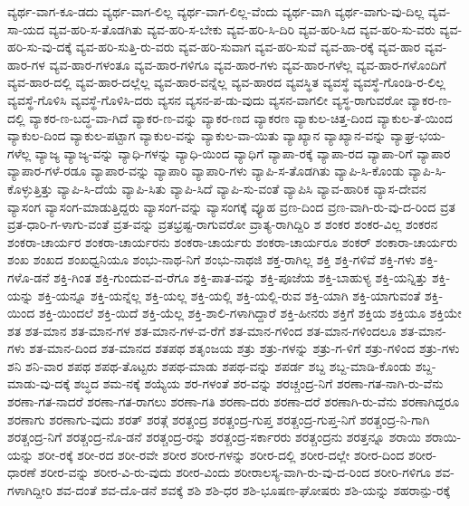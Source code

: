 {ವ್ಯರ್ಥ-ವಾಗ-ಕೂ-ಡದು
ವ್ಯರ್ಥ-ವಾಗ-ಲಿಲ್ಲ
ವ್ಯರ್ಥ-ವಾಗ-ಲಿಲ್ಲ-ವೆಂದು
ವ್ಯರ್ಥ-ವಾಗಿ
ವ್ಯರ್ಥ-ವಾಗು-ವು-ದಿಲ್ಲ
ವ್ಯವ-ಸಾ-ಯದ
ವ್ಯವ-ಹರಿ-ಸ-ತೊಡಗಿತು
ವ್ಯವ-ಹರಿ-ಸ-ಬೇಕು
ವ್ಯವ-ಹರಿ-ಸಿ-ದಿರಿ
ವ್ಯವ-ಹರಿ-ಸಿದ
ವ್ಯವ-ಹರಿ-ಸು-ವರು
ವ್ಯವ-ಹರಿ-ಸು-ವು-ದಕ್ಕೆ
ವ್ಯವ-ಹರಿ-ಸುತ್ತಿ-ರು-ವರು
ವ್ಯವ-ಹರಿ-ಸುವಾಗ
ವ್ಯವ-ಹರಿ-ಸುವೆ
ವ್ಯವ-ಹಾ-ರಕ್ಕೆ
ವ್ಯವ-ಹಾರ
ವ್ಯವ-ಹಾರ-ಗಳ
ವ್ಯವ-ಹಾರ-ಗಳಂತೂ
ವ್ಯವ-ಹಾರ-ಗಳಿಗೂ
ವ್ಯವ-ಹಾರ-ಗಳು
ವ್ಯವ-ಹಾರ-ಗಳೆಲ್ಲ
ವ್ಯವ-ಹಾರ-ಗಳೊಂದಿಗೆ
ವ್ಯವ-ಹಾರ-ದಲ್ಲಿ
ವ್ಯವ-ಹಾರ-ದಲ್ಲೆಲ್ಲ
ವ್ಯವ-ಹಾರ-ವನ್ನೆಲ್ಲ
ವ್ಯವ-ಹಾರದ
ವ್ಯವಸ್ಥಿತ
ವ್ಯವಸ್ಥೆ
ವ್ಯವಸ್ಥೆ-ಗೊಂಡಿ-ರ-ಲಿಲ್ಲ
ವ್ಯವಸ್ಥೆ-ಗೊಳಿಸಿ
ವ್ಯವಸ್ಥೆ-ಗೊಳಿಸಿ-ದರು
ವ್ಯಸನ
ವ್ಯಸನ-ಪ-ಡು-ವುದು
ವ್ಯಸನ-ವಾಗಲೀ
ವ್ಯಸ್ಥ-ರಾಗುವರೋ
ವ್ಯಾಕರ-ಣ-ದಲ್ಲಿ
ವ್ಯಾಕರ-ಣ-ಬದ್ಧ-ವಾ-ಗಿದೆ
ವ್ಯಾಕರ-ಣ-ವನ್ನು
ವ್ಯಾಕರ-ಣದ
ವ್ಯಾಕರಣ
ವ್ಯಾಕುಲ-ಚಿತ್ತ-ದಿಂದ
ವ್ಯಾಕುಲ-ತೆ-ಯಿಂದ
ವ್ಯಾಕುಲ-ದಿಂದ
ವ್ಯಾಕುಲ-ಪಟ್ಟಾಗ
ವ್ಯಾಕುಲ-ವನ್ನು
ವ್ಯಾಕುಲ-ವಾ-ಯಿತು
ವ್ಯಾಖ್ಯಾನ
ವ್ಯಾಖ್ಯಾನ-ವನ್ನು
ವ್ಯಾಘ್ರ-ಭಯ-ಗಳೆಲ್ಲ
ವ್ಯಾಜ್ಯ
ವ್ಯಾಜ್ಯ-ವನ್ನು
ವ್ಯಾಧಿ-ಗಳನ್ನು
ವ್ಯಾಧಿ-ಯಿಂದ
ವ್ಯಾಧಿಗೆ
ವ್ಯಾಪಾ-ರಕ್ಕೆ
ವ್ಯಾಪಾ-ರದ
ವ್ಯಾಪಾ-ರಿಗೆ
ವ್ಯಾಪಾರ
ವ್ಯಾಪಾರ-ಗಳೆ-ರಡೂ
ವ್ಯಾಪಾರ-ವನ್ನು
ವ್ಯಾಪಾರಿ
ವ್ಯಾಪಾರಿ-ಗಳು
ವ್ಯಾಪಿ-ಸ-ತೊಡಗಿತು
ವ್ಯಾಪಿ-ಸಿ-ಕೊಂಡು
ವ್ಯಾಪಿ-ಸಿ-ಕೊಳ್ಳುತ್ತಿತ್ತು
ವ್ಯಾಪಿ-ಸಿ-ದೆಯೆ
ವ್ಯಾಪಿ-ಸಿತು
ವ್ಯಾಪಿ-ಸಿದೆ
ವ್ಯಾಪಿ-ಸು-ವಂತೆ
ವ್ಯಾಪಿಸಿ
ವ್ಯಾವ-ಹಾರಿಕ
ವ್ಯಾಸ-ದೇವನ
ವ್ಯಾಸಂಗ
ವ್ಯಾಸಂಗ-ಮಾಡುತ್ತಿದ್ದರು
ವ್ಯಾಸಂಗ-ವನ್ನು
ವ್ಯಾಸಂಗಕ್ಕೆ
ವ್ಯೂಹ
ವ್ರಣ-ದಿಂದ
ವ್ರಣ-ವಾಗಿ-ರು-ವು-ದ-ರಿಂದ
ವ್ರತ
ವ್ರತ-ಧಾರಿ-ಗ-ಳಾಗು-ವಂತೆ
ವ್ರತ-ವನ್ನು
ವ್ರತಭ್ರಷ್ಟ-ರಾಗುವರೋ
ವ್ರಾತ್ಯ-ರಾಗಿದ್ದಿರಿ
ಶ
ಶಂಕರ
ಶಂಕರ-ವಿಲ್ಲ
ಶಂಕರನ
ಶಂಕರಾ-ಚಾರ್ಯರ
ಶಂಕರಾ-ಚಾರ್ಯರನು
ಶಂಕರಾ-ಚಾರ್ಯರು
ಶಂಕರಾ-ಚಾರ್ಯರೂ
ಶಂಕರ್
ಶಂಕಾರಾ-ಚಾರ್ಯರು
ಶಂಖ
ಶಂಖದ
ಶಂಖಧ್ವನಿಯೂ
ಶಂಭು-ನಾಥ-ನಿಗೆ
ಶಂಭು-ನಾಥಜಿ
ಶಕ್ತ-ರಾಗಿಲ್ಲ
ಶಕ್ತಿ
ಶಕ್ತಿ-ಗಳಿವೆ
ಶಕ್ತಿ-ಗಳು
ಶಕ್ತಿ-ಗಳೊ-ಡನೆ
ಶಕ್ತಿ-ಗಿಂತ
ಶಕ್ತಿ-ಗುಂದುವ-ವ-ರೆಗೂ
ಶಕ್ತಿ-ಪಾತ-ವನ್ನು
ಶಕ್ತಿ-ಪೂಜೆಯ
ಶಕ್ತಿ-ಬಾಹುಳ್ಯ
ಶಕ್ತಿ-ಯನ್ನಿತ್ತು
ಶಕ್ತಿ-ಯನ್ನು
ಶಕ್ತಿ-ಯನ್ನೂ
ಶಕ್ತಿ-ಯನ್ನೆಲ್ಲ
ಶಕ್ತಿ-ಯಲ್ಲ
ಶಕ್ತಿ-ಯಲ್ಲಿ
ಶಕ್ತಿ-ಯಲ್ಲಿ-ರುವ
ಶಕ್ತಿ-ಯಾಗಿ
ಶಕ್ತಿ-ಯಾಗುವಂತೆ
ಶಕ್ತಿ-ಯಿಂದ
ಶಕ್ತಿ-ಯಿಂದಲೆ
ಶಕ್ತಿ-ಯಿದೆ
ಶಕ್ತಿ-ಯೆಲ್ಲ
ಶಕ್ತಿ-ಶಾಲಿ-ಗಳಾಗಿದ್ದಾರೆ
ಶಕ್ತಿ-ಹೀನರು
ಶಕ್ತಿಗೆ
ಶಕ್ತಿಯ
ಶಕ್ತಿಯೂ
ಶಕ್ತಿಯೇ
ಶತ
ಶತ-ಮಾನ
ಶತ-ಮಾನ-ಗಳ
ಶತ-ಮಾನ-ಗಳ-ವ-ರೆಗೆ
ಶತ-ಮಾನ-ಗಳಿಂದ
ಶತ-ಮಾನ-ಗಳಿಂದಲೂ
ಶತ-ಮಾನ-ಗಳು
ಶತ-ಮಾನ-ದಿಂದ
ಶತ-ಮಾನದ
ಶತಪಥ
ಶತೃಂಜಯ
ಶತ್ರು
ಶತ್ರು-ಗಳನ್ನು
ಶತ್ರು-ಗ-ಳಿಗೆ
ಶತ್ರು-ಗಳಿಂದ
ಶತ್ರು-ಗಳು
ಶನಿ
ಶನಿ-ವಾರ
ಶಪಥ
ಶಪಥ-ತೊಟ್ಟರು
ಶಪಥ-ಮಾಡು
ಶಪಥ-ವನ್ನು
ಶಪರ್ಡ
ಶಬ್ದ
ಶಬ್ದ-ಮಾಡಿ-ಕೊಂಡು
ಶಬ್ದ-ಮಾಡು-ವು-ದಕ್ಕೆ
ಶಬ್ಧದ
ಶಮ-ನಕ್ಕೆ
ಶಯ್ಯೆಯ
ಶರ-ಗಳಂತೆ
ಶರ-ವನ್ನು
ಶರಚ್ಚಂದ್ರ-ನಿಗೆ
ಶರಣಾ-ಗತ-ನಾಗಿ-ರು-ವೆನು
ಶರಣಾ-ಗತ-ನಾದರೆ
ಶರಣಾ-ಗತ-ರಾಗಲು
ಶರಣಾ-ಗತಿ
ಶರಣಾ-ದರು
ಶರಣಾ-ದರೆ
ಶರಣಾಗಿ-ರು-ವೆನು
ಶರಣಾಗಿದ್ದರೂ
ಶರಣಾಗು
ಶರಣಾಗು-ವುದು
ಶರತ್
ಶರತ್ಗೆ
ಶರತ್ಚಂದ್ರ
ಶರತ್ಚಂದ್ರ-ಗುಪ್ತ
ಶರತ್ಚಂದ್ರ-ಗುಪ್ತ-ನಿಗೆ
ಶರತ್ಚಂದ್ರ-ನಿ-ಗಾಗಿ
ಶರತ್ಚಂದ್ರ-ನಿಗೆ
ಶರತ್ಚಂದ್ರ-ನೊ-ಡನೆ
ಶರತ್ಚಂದ್ರ-ರನ್ನು
ಶರತ್ಚಂದ್ರ-ಸರ್ಕಾರರು
ಶರತ್ಚಂದ್ರನು
ಶರತ್ತನ್ನೂ
ಶರಾಯಿ
ಶರಾಯಿ-ಯನ್ನು
ಶರೀ-ರಕ್ಕೆ
ಶರೀ-ರದ
ಶರೀ-ರವೇ
ಶರೀರ
ಶರೀರ-ಗಳನ್ನು
ಶರೀರ-ದಲ್ಲಿ
ಶರೀರ-ದಲ್ಲೇ
ಶರೀರ-ದಿಂದ
ಶರೀರ-ಧಾರಣೆ
ಶರೀರ-ವನ್ನು
ಶರೀರ-ವಿ-ರು-ವುದು
ಶರೀರ-ವಿಂದು
ಶರೀರಾಲಸ್ಯ-ವಾಗಿ-ರು-ವು-ದ-ರಿಂದ
ಶರೀರಿ-ಗಳಿಗೂ
ಶವ-ಗಳಾಗಿದ್ದೀರಿ
ಶವ-ದಂತೆ
ಶವ-ದೊ-ಡನೆ
ಶವಕ್ಕೆ
ಶಶಿ
ಶಶಿ-ಧರ
ಶಶಿ-ಭೂಷಣ-ಘೋಷರು
ಶಶಿ-ಯನ್ನು
ಶಹರಾನ್ಪು-ರಕ್ಕೆ
}
